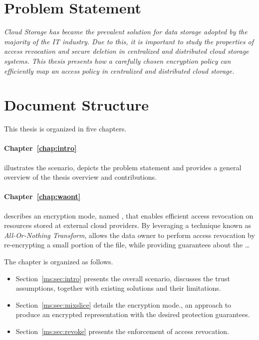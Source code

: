 {\bigskip

\section{Problem Statement}

{\em Cloud Storage has became the prevalent solution for data storage adopted by the majority of the IT industry. Due to this, it is important to study the properties of access revocation and secure deletion in centralized and distributed cloud storage systems. This thesis presents how a carefully chosen encryption policy can efficiently map an access policy in centralized and distributed cloud storage.}

\bigskip

\section{Document Structure}


This thesis is organized in five chapters.

\smallskip

\paragraph*{Chapter~\ref{chap:intro}} illustrates the scenario, depicts the problem statement and provides a general overview of the thesis overview and contributions.

\paragraph*{Chapter~\ref{chap:waont}}
describes an encryption mode, named \name, that enables efficient access revocation on resources stored at external cloud providers. By leveraging a technique known as {\em All-Or-Nothing Transform}, \name allows the data owner to perform access revocation by re-encrypting a small portion of the file, while providing guarantees about the \ldots

\smallskip

The chapter is organized as follows.

\begin{itemize}
	\item Section~\ref{ms:sec:intro} presents the overall scenario, discusses the trust assumptions, together with existing solutions and their limitations.
	
	\item Section~\ref{ms:sec:mixslice} details the \name encryption mode., an approach to produce an encrypted representation with the desired protection guarantees.
	\item Section~\ref{ms:sec:revoke} presents the enforcement of access revocation. 
	

\end{itemize}}
